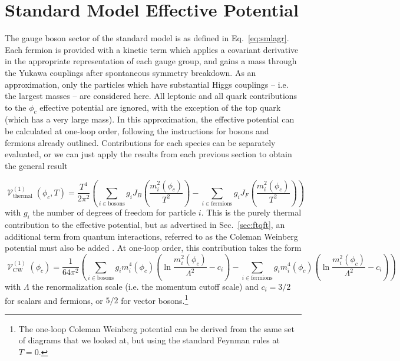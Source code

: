 \documentclass[%
 reprint,
nofootinbib,
 amsmath,amssymb,
 aps,
floatfix,
]{revtex4-1}
\DeclareMathOperator{\V}{\mathcal{V}}
\begin{document}
\section{\label{sec:smphasepred}Standard Model Effective Potential}
The gauge boson sector of the standard model is as defined in Eq.~\ref{eq:smlagr}.
Each fermion is provided with a kinetic term which applies a covariant derivative in the appropriate representation of each gauge group, and gains a mass through the Yukawa couplings after spontaneous symmetry breakdown.
As an approximation, only the particles which have substantial Higgs couplings -- i.e. the largest masses -- are considered here.
All leptonic and all quark contributions to the $\phi_c$ effective potential are ignored, with the exception of the top quark (which has a very large mass).
In this approximation, the effective potential can be calculated at one-loop order, following the instructions for bosons and fermions already outlined.
Contributions for each species can be separately evaluated, or we can just apply the results from each previous section to obtain the general result
\begin{widetext}
\begin{equation}
    \V_\text{thermal}^{(1)} (\phi_c, T) = \frac{T^4}{2\pi^2} \left(\sum_{i\in\text{bosons}}g_i J_B \left(\frac{m_i^2(\phi_c)}{T^2}\right) - \sum_{i\in\text{fermions}}g_i J_F\left(\frac{m_i^2(\phi_c)}{T^2}\right)\right)
\end{equation}
with $g_i$ the number of degrees of freedom for particle $i$.
This is the purely thermal contribution to the effective potential, but as advertised in Sec.~\ref{sec:ftqft}, an additional term from quantum interactions, referred to as the Coleman Weinberg potential must also be added \cite{cw73,quiros99,long12,cmr18}. At one-loop order, this contribution takes the form \cite{cmr18}
\begin{equation}
    \V_\text{CW}^{(1)} (\phi_c) = \frac{1}{64\pi^2}\left(\sum_{i\in\text{bosons}}g_i m_i^4(\phi_c) \left(\ln \frac{m_i^2(\phi_c)}{\Lambda^2} - c_i\right) - \sum_{i\in\text{fermions}}g_i m_i^4(\phi_c) \left(\ln \frac{m_i^2(\phi_c)}{\Lambda^2} - c_i\right)\right)
\end{equation}
with $\Lambda$ the renormalization scale (i.e. the momentum cutoff scale) and $c_i = 3/2$ for scalars and fermions, or $5/2$ for vector bosons.\footnote{The one-loop Coleman Weinberg potential can be derived from the same set of diagrams that we looked at, but using the standard Feynman rules at $T=0$.}
\end{widetext}
\end{document}
